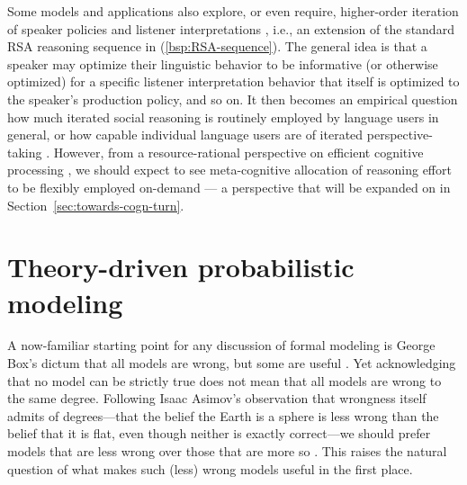 \documentclass[fleqn,reqno,12pt]{article}
\begin{document}
Some models and applications also explore, or even require, higher-order iteration of speaker policies and listener interpretations \citep[e.g.][]{FrankeJager2014:Pragmatic-Back-,BergenLevy2014:Pragmatic-Reaso,Frank2016:Rational-speech}, i.e., an extension of the standard RSA reasoning sequence in (\ref{bsp:RSA-sequence}).
The general idea is that a speaker may optimize their linguistic behavior to be informative (or otherwise optimized) for a specific listener interpretation behavior that itself is optimized to the speaker's production policy, and so on.
It then becomes an empirical question how much iterated social reasoning is routinely employed by language users in general, or how capable individual language users are of iterated perspective-taking \citep[e.g.,][]{FrankeDegen2015:Reasoning-in-Re}.
However, from a resource-rational perspective on efficient cognitive processing \citep{LiederGriffiths2019:Resource-ration}, we should expect to see meta-cognitive allocation of reasoning effort to be flexibly employed on-demand --- a perspective that will be expanded on in Section~\ref{sec:towards-cogn-turn}.


\bigskip

\section{Theory-driven probabilistic modeling}
\label{sec:theory-driv-prob}

A now-familiar starting point for any discussion of formal modeling is George Box's dictum that all models are wrong, but some are useful \citep{Box1979:Robustness-in-t}.
Yet acknowledging that no model can be strictly true does not mean that all models are wrong to the same degree.
Following Isaac Asimov's observation that wrongness itself admits of degrees—that the belief the Earth is a sphere is less wrong than the belief that it is flat, even though neither is exactly correct—we should prefer models that are less wrong over those that are more so \citep{Asimov1988:The-Relativity-}.
This raises the natural question of what makes such (less) wrong models useful in the first place.
\end{document}
